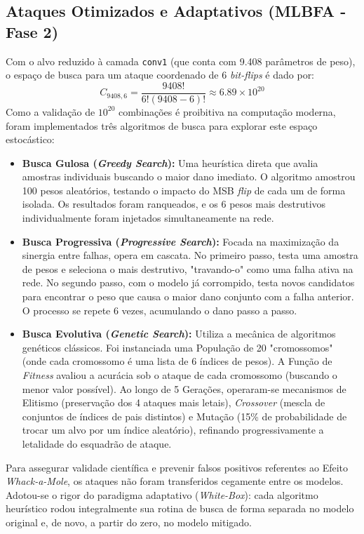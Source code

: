 \documentclass[11pt, a4paper]{article}
\begin{document}
\subsection{Ataques Otimizados e Adaptativos (MLBFA - Fase 2)}
Com o alvo reduzido à camada \texttt{conv1} (que conta com 9.408 parâmetros de peso), o espaço de busca para um ataque coordenado de 6 \textit{bit-flips} é dado por:
\begin{equation}
C_{9408, 6} = \frac{9408!}{6!(9408-6)!} \approx 6.89 \times 10^{20}
\end{equation}
Como a validação de $10^{20}$ combinações é proibitiva na computação moderna, foram implementados três algoritmos de busca para explorar este espaço estocástico:

\begin{itemize}
    \item \textbf{Busca Gulosa (\textit{Greedy Search}):} Uma heurística direta que avalia amostras individuais buscando o maior dano imediato. O algoritmo amostrou 100 pesos aleatórios, testando o impacto do MSB \textit{flip} de cada um de forma isolada. Os resultados foram ranqueados, e os 6 pesos mais destrutivos individualmente foram injetados simultaneamente na rede.
    \item \textbf{Busca Progressiva (\textit{Progressive Search}):} Focada na maximização da sinergia entre falhas, opera em cascata. No primeiro passo, testa uma amostra de pesos e seleciona o mais destrutivo, "travando-o" como uma falha ativa na rede. No segundo passo, com o modelo já corrompido, testa novos candidatos para encontrar o peso que causa o maior dano conjunto com a falha anterior. O processo se repete 6 vezes, acumulando o dano passo a passo.
    \item \textbf{Busca Evolutiva (\textit{Genetic Search}):} Utiliza a mecânica de algoritmos genéticos clássicos. Foi instanciada uma População de 20 "cromossomos" (onde cada cromossomo é uma lista de 6 índices de pesos). A Função de \textit{Fitness} avaliou a acurácia sob o ataque de cada cromossomo (buscando o menor valor possível). Ao longo de 5 Gerações, operaram-se mecanismos de Elitismo (preservação dos 4 ataques mais letais), \textit{Crossover} (mescla de conjuntos de índices de pais distintos) e Mutação (15\% de probabilidade de trocar um alvo por um índice aleatório), refinando progressivamente a letalidade do esquadrão de ataque.
\end{itemize}

Para assegurar validade científica e prevenir falsos positivos referentes ao Efeito \textit{Whack-a-Mole}, os ataques não foram transferidos cegamente entre os modelos. Adotou-se o rigor do paradigma adaptativo (\textit{White-Box}): cada algoritmo heurístico rodou integralmente sua rotina de busca de forma separada no modelo original e, de novo, a partir do zero, no modelo mitigado. 
\end{document}
